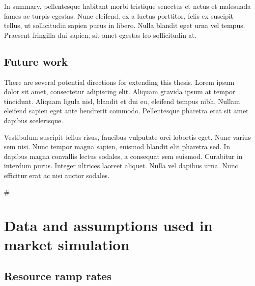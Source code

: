 \documentclass[12pt,a4paper,]{report}
\begin{document}
In summary, pellentesque habitant morbi tristique senectus et netus et
malesuada fames ac turpis egestas. Nunc eleifend, ex a luctus porttitor,
felis ex suscipit tellus, ut sollicitudin sapien purus in libero. Nulla
blandit eget urna vel tempus. Praesent fringilla dui sapien, sit amet
egestas leo sollicitudin at.

\hypertarget{future-work}{%
\section{Future work}\label{future-work}}

There are several potential directions for extending this thesis. Lorem
ipsum dolor sit amet, consectetur adipiscing elit. Aliquam gravida ipsum
at tempor tincidunt. Aliquam ligula nisl, blandit et dui eu, eleifend
tempus nibh. Nullam eleifend sapien eget ante hendrerit commodo.
Pellentesque pharetra erat sit amet dapibus scelerisque.

Vestibulum suscipit tellus risus, faucibus vulputate orci lobortis eget.
Nunc varius sem nisi. Nunc tempor magna sapien, euismod blandit elit
pharetra sed. In dapibus magna convallis lectus sodales, a consequat sem
euismod. Curabitur in interdum purus. Integer ultrices laoreet aliquet.
Nulla vel dapibus urna. Nunc efficitur erat ac nisi auctor sodales.

\appendix

\#

\renewcommand\thefigure{\thesection.\arabic{figure}} 
\renewcommand\thetable{\thesection.\arabic{table}}

\hypertarget{data-and-assumptions-used-in-market-simulation}{%
\chapter{Data and assumptions used in market
simulation}\label{data-and-assumptions-used-in-market-simulation}}

\hypertarget{resource-ramp-rates}{%
\section{Resource ramp rates}\label{resource-ramp-rates}}
\end{document}
